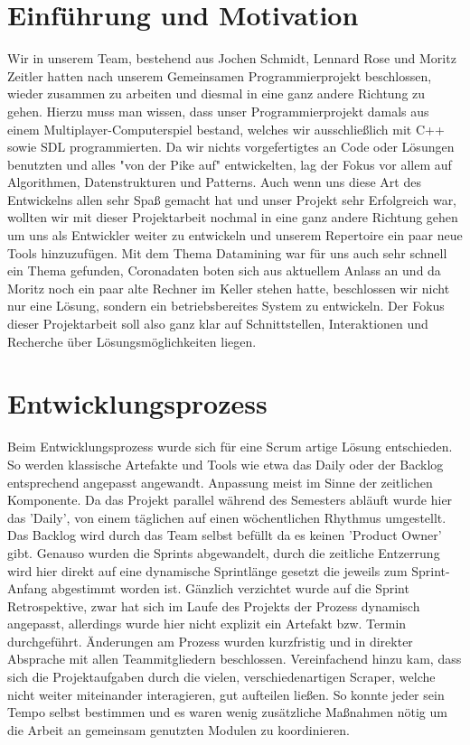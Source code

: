 \documentclass[12pt,oneside,a4paper,parskip]{scrbook}
\begin{document}
\chapter{Einführung und Motivation}\label{ch:intro}
Wir in unserem Team, bestehend aus Jochen Schmidt, Lennard Rose und Moritz Zeitler hatten nach unserem Gemeinsamen Programmierprojekt beschlossen, wieder zusammen zu arbeiten und diesmal in eine ganz andere Richtung zu gehen. Hierzu muss man wissen, dass unser Programmierprojekt damals aus einem Multiplayer-Computerspiel bestand, welches wir ausschließlich mit C++ sowie SDL programmierten. Da wir nichts vorgefertigtes an Code oder Lösungen benutzten und alles "von der Pike auf"  entwickelten, lag der Fokus vor allem auf Algorithmen, Datenstrukturen und Patterns. Auch wenn uns diese Art des Entwickelns allen sehr Spaß gemacht hat und unser Projekt sehr Erfolgreich war, wollten wir mit dieser Projektarbeit nochmal in eine ganz andere Richtung gehen um uns als Entwickler weiter zu entwickeln und unserem Repertoire ein paar neue Tools hinzuzufügen. Mit dem Thema Datamining war für uns auch sehr schnell ein Thema gefunden, Coronadaten boten sich aus aktuellem Anlass an und da Moritz noch ein paar alte Rechner im Keller stehen hatte, beschlossen wir nicht nur eine Lösung, sondern ein betriebsbereites System zu entwickeln. \newline
Der Fokus dieser Projektarbeit soll also ganz klar auf Schnittstellen, Interaktionen und Recherche über Lösungsmöglichkeiten liegen.

\chapter{Entwicklungsprozess}
Beim Entwicklungsprozess wurde sich f\"ur eine Scrum artige L\"osung entschieden. So werden klassische Artefakte und Tools wie etwa das Daily oder der Backlog entsprechend angepasst angewandt. Anpassung meist im Sinne der zeitlichen Komponente. Da das Projekt parallel w\"ahrend des Semesters abl\"auft wurde hier das 'Daily', von einem t\"aglichen auf einen w\"ochentlichen Rhythmus umgestellt. Das Backlog wird durch das Team selbst bef\"ullt da es keinen 'Product Owner' gibt. Genauso wurden die Sprints abgewandelt, durch die zeitliche Entzerrung wird hier direkt auf eine dynamische Sprintl\"ange gesetzt die jeweils zum Sprint-Anfang abgestimmt worden ist. \newline
G\"anzlich verzichtet wurde auf die Sprint Retrospektive, zwar hat sich im Laufe des Projekts der Prozess dynamisch angepasst, allerdings wurde hier nicht explizit ein Artefakt bzw. Termin durchgef\"uhrt. \"Anderungen am Prozess wurden kurzfristig und in direkter Absprache mit allen Teammitgliedern beschlossen. Vereinfachend hinzu kam, dass sich die Projektaufgaben durch die vielen, verschiedenartigen Scraper, welche nicht weiter miteinander interagieren, gut aufteilen ließen. So konnte jeder sein Tempo selbst bestimmen und es waren wenig zusätzliche Maßnahmen nötig um die Arbeit an gemeinsam genutzten Modulen zu koordinieren.
\end{document}
